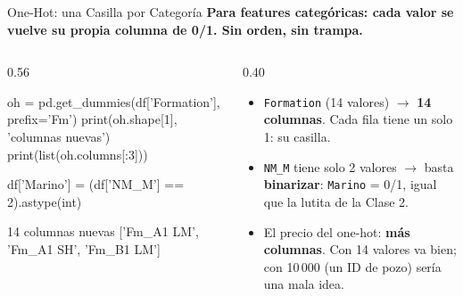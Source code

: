 \documentclass[aspectratio=169, 11pt]{beamer}
\begin{document}
\begin{frame}[fragile,shrink=22]{One-Hot: una Casilla por Categoría}
  \vspace{-4pt}
  {\small\color{arcaDark}\bfseries
    Para features categóricas: cada valor se vuelve su \textbf{propia columna} de 0/1. Sin orden, sin trampa.}

  \vspace{4pt}
  \begin{columns}[T]
    \begin{column}{0.56\textwidth}
      \begin{pyblock}
oh = pd.get_dummies(df['Formation'],
                    prefix='Fm')
print(oh.shape[1], 'columnas nuevas')
print(list(oh.columns[:3]))

df['Marino'] = (df['NM_M'] == 2).astype(int)
      \end{pyblock}
      \vspace{2pt}
      \begin{outputblock}
14 columnas nuevas
['Fm_A1 LM', 'Fm_A1 SH', 'Fm_B1 LM']
      \end{outputblock}
    \end{column}
    \begin{column}{0.40\textwidth}
      {\scriptsize\color{textMuted}
      \begin{itemize}\setlength{\itemsep}{5pt}
        \item[{\color{arcaRed}\scriptsize\faColumns}]
          \texttt{Formation} (14 valores) \(\to\) \textbf{14 columnas}.
          Cada fila tiene un solo 1: su casilla.
        \item[{\color{codeGreen}\scriptsize\faCheck}]
          \texttt{NM\_M} tiene solo 2 valores \(\to\) basta
          \textbf{binarizar}: \texttt{Marino} = 0/1,
          igual que la lutita de la Clase 2.
        \item[{\color{arcaRed}\scriptsize\faExclamationTriangle}]
          El precio del one-hot: \textbf{más columnas}.
          Con 14 valores va bien; con 10\,000 (un ID de pozo)
          sería una mala idea.
      \end{itemize}
      }
    \end{column}
  \end{columns}
\end{frame}
\end{document}
